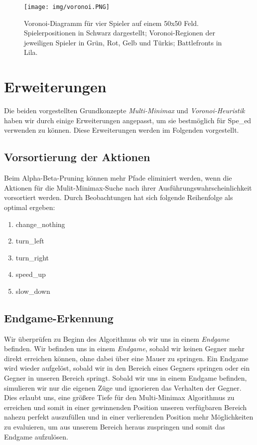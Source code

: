 \begin{figure}[ht]
    \centering
    \texttt{[image: img/voronoi.PNG]}
    \caption[Voronoi-Diagramm]{Voronoi-Diagramm für vier Spieler auf einem 50x50 Feld. Spielerpositionen in Schwarz dargestellt; Voronoi-Regionen der jeweiligen Spieler in Grün, Rot, Gelb und Türkis; Battlefronts in Lila.}
	\label{fig:voronoi}
\end{figure}

\section{Erweiterungen}
\label{cha:Erweiterungen}

Die beiden vorgestellten Grundkonzepte \textit{Multi-Minimax} und \textit{Voronoi-Heuristik} haben wir durch einige Erweiterungen angepasst, um sie bestmöglich für Spe\_ed verwenden zu können. Diese Erweiterungen werden im Folgenden vorgestellt.

\subsection{Vorsortierung der Aktionen}

Beim Alpha-Beta-Pruning können mehr Pfade eliminiert werden, wenn die Aktionen für die Mulit-Minimax-Suche nach ihrer Ausführungswahrscheinlichkeit vorsortiert werden. Durch Beobachtungen hat sich folgende Reihenfolge als optimal ergeben:
\begin{enumerate}
    \item change\_nothing
    \item turn\_left
    \item turn\_right
    \item speed\_up
    \item slow\_down
\end{enumerate}

\subsection{Endgame-Erkennung}

Wir überprüfen zu Beginn des Algorithmus ob wir uns in einem \textit{Endgame} befinden. Wir befinden uns in einem \textit{Endgame}, sobald wir keinen Gegner mehr direkt erreichen können, ohne dabei über eine Mauer zu springen. Ein Endgame wird wieder aufgelöst, sobald wir in den Bereich eines Gegners springen oder ein Gegner in unseren Bereich springt. Sobald wir uns in einem Endgame befinden, simulieren wir nur die eigenen Züge und ignorieren das Verhalten der Gegner. Dies erlaubt uns, eine größere Tiefe für den Multi-Minimax Algorithmus zu erreichen und somit in einer gewinnenden Position unseren verfügbaren Bereich nahezu perfekt auszufüllen und in einer verlierenden Position mehr Möglichkeiten zu evaluieren, um aus unserem Bereich heraus zuspringen und somit das Endgame aufzulösen.  

